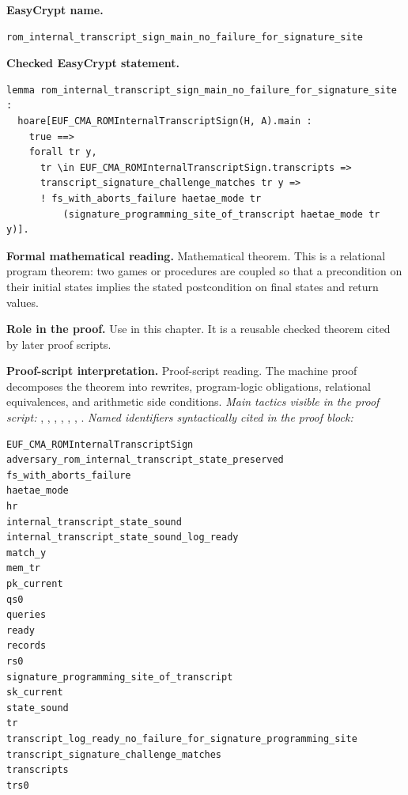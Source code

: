 \begin{formaltheorem}
\noindent\textbf{EasyCrypt name.}
\begin{lstlisting}[language=EasyCrypt,basicstyle=\ttfamily\scriptsize]
rom_internal_transcript_sign_main_no_failure_for_signature_site
\end{lstlisting}
\noindent\textbf{Checked EasyCrypt statement.}
\begin{lstlisting}[language=EasyCrypt,basicstyle=\ttfamily\scriptsize]
lemma rom_internal_transcript_sign_main_no_failure_for_signature_site :
  hoare[EUF_CMA_ROMInternalTranscriptSign(H, A).main :
    true ==>
    forall tr y,
      tr \in EUF_CMA_ROMInternalTranscriptSign.transcripts =>
      transcript_signature_challenge_matches tr y =>
      ! fs_with_aborts_failure haetae_mode tr
          (signature_programming_site_of_transcript haetae_mode tr y)].
\end{lstlisting}
\noindent\textbf{Formal mathematical reading.}
Mathematical theorem. This is a relational program theorem: two games or procedures are coupled so that a precondition on their initial states implies the stated postcondition on final states and return values.

\noindent\textbf{Role in the proof.}
Use in this chapter. It is a reusable checked theorem cited by later proof scripts.

\noindent\textbf{Proof-script interpretation.}
Proof-script reading. The machine proof decomposes the theorem into rewrites, program-logic obligations, relational equivalences, and arithmetic side conditions.
\emph{Main tactics visible in the proof script:} , , , , , , .
\emph{Named identifiers syntactically cited in the proof block:}
\begin{lstlisting}[language=EasyCrypt,basicstyle=\ttfamily\scriptsize]
EUF_CMA_ROMInternalTranscriptSign
adversary_rom_internal_transcript_state_preserved
fs_with_aborts_failure
haetae_mode
hr
internal_transcript_state_sound
internal_transcript_state_sound_log_ready
match_y
mem_tr
pk_current
qs0
queries
ready
records
rs0
signature_programming_site_of_transcript
sk_current
state_sound
tr
transcript_log_ready_no_failure_for_signature_programming_site
transcript_signature_challenge_matches
transcripts
trs0
\end{lstlisting}

\end{formaltheorem}

